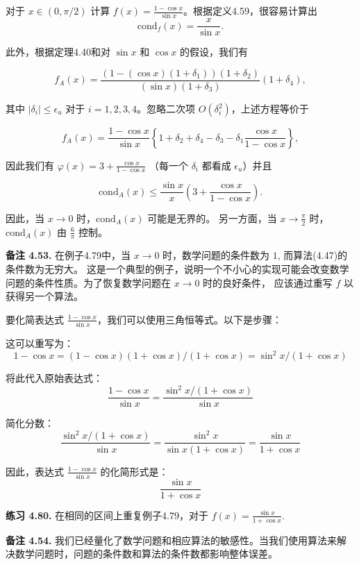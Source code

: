 \documentclass[a4paper]{ctexart}
\begin{document}
{对于 \( x \in (0, \pi/2) \) 计算 \( f(x) = \frac{1 - \cos x}{\sin x} \)。根据定义4.59，很容易计算出
\[
  \text{cond}_f(x) = \frac{x}{\sin x}.
\]

此外，根据定理4.40和对 \( \sin x \) 和 \( \cos x \) 的假设，我们有

\[
  f_A(x) = \frac{(1 - (\cos x)(1 + \delta_1))(1 + \delta_2)}{(\sin x)(1 + \delta_3)}(1 + \delta_4),
\]

其中 \( |\delta_i| \leq \epsilon_u \) 对于 \( i = 1, 2, 3, 4 \)。忽略二次项 \( O(\delta_i^2) \)，上述方程等价于

\[
  f_A(x) = \frac{1 - \cos x}{\sin x} \left\{ 1 + \delta_2 + \delta_4 - \delta_3 - \delta_1 \frac{\cos x}{1 - \cos x} \right\},
\]

因此我们有 \( \varphi(x) = 3 + \frac{\cos x}{1 - \cos x} \) （每一个 $\delta_i$ 都看成 $\epsilon_u$）并且

\[
  \text{cond}_A(x) \leq \frac{\sin x}{x} \left( 3 + \frac{\cos x}{1 - \cos x} \right).
\]

因此，当 \( x \rightarrow 0 \) 时，\( \text{cond}_A(x) \) 可能是无界的。
另一方面，当 \( x \rightarrow \frac{\pi}{2} \) 时，\( \text{cond}_A(x) \) 由 \( \frac{6}{\pi} \) 控制。

\noindent \textbf{备注 4.53.} 在例子4.79中，当 \( x \rightarrow 0 \) 时，数学问题的条件数为 $1$,
而算法(4.47)的条件数为无穷大。
这是一个典型的例子，说明一个不小心的实现可能会改变数学问题的条件性质。为了恢复数学问题在 \( x \rightarrow 0 \) 时的良好条件，
应该通过重写 \( f \) 以获得另一个算法。

要化简表达式 \(\frac{1 - \cos x}{\sin x}\)，我们可以使用三角恒等式。以下是步骤：

这可以重写为：
\[
   1 - \cos x = (1 - \cos x)(1 + \cos x) / (1 + \cos x) = \sin^2 x / (1 + \cos x)
\]

将此代入原始表达式：
\[
   \frac{1 - \cos x}{\sin x} = \frac{\sin^2 x / (1 + \cos x)}{\sin x}
\]

简化分数：
\[
   \frac{\sin^2 x / (1 + \cos x)}{\sin x} = \frac{\sin^2 x}{\sin x (1 + \cos x)} 
   = \frac{\sin x}{1 + \cos x}
\]

因此，表达式 \(\frac{1 - \cos x}{\sin x}\) 的化简形式是：
\[
  \frac{\sin x}{1 + \cos x}
\]


\noindent \textbf{练习 4.80.} 在相同的区间上重复例子4.79，对于 \( f(x) = \frac{\sin x}{1 + \cos x} \).

\noindent \textbf{备注 4.54.} 我们已经量化了数学问题和相应算法的敏感性。当我们使用算法来解决数学问题时，问题的条件数和算法的条件数都影响整体误差。

}
\end{document}
